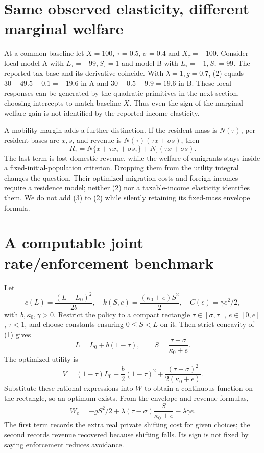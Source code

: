 \documentclass[11pt]{article}
\theoremstyle{definition}
\begin{document}
\section*{Same observed elasticity, different marginal welfare}
At a common baseline let $X=100$, $\tau=0.5$, $\sigma=0.4$ and
$X_\tau=-100$. Consider local model A with $L_\tau=-99,S_\tau=1$ and model B
with $L_\tau=-1,S_\tau=99$. The reported tax base and its derivative coincide.
With $\lambda=1,g=0.7$, (2) equals $30-49.5-0.1=-19.6$ in A and $30-0.5-9.9=19.6$ in B.
These local responses can be generated by the quadratic primitives in the next
section, choosing intercepts to match baseline $X$. Thus even the sign of the
marginal welfare gain is not identified by the reported-income elasticity.

A mobility margin adds a further distinction. If the resident mass is $N(\tau)$,
per-resident bases are $x,s$, and revenue is
$N(\tau)(\tau x+\sigma s)$, then
\[
 R_\tau=N\{x+\tau x_\tau+\sigma s_\tau\}
       +N_\tau(\tau x+\sigma s).                         \tag{3}
\]
The last term is lost domestic revenue, while the welfare of emigrants stays
inside a fixed-initial-population criterion. Dropping them from the utility
integral changes the question. Their optimized migration costs and foreign
incomes require a residence model; neither (2) nor a taxable-income elasticity
identifies them. We do not add (3) to (2) while silently retaining its fixed-mass
envelope formula.

\section*{A computable joint rate/enforcement benchmark}
Let
\[
 c(L)=\frac{(L-L_0)^2}{2b},\quad
 k(S,e)=\frac{(\kappa_0+e)S^2}{2},\quad
 C(e)=\gamma e^2/2,
\]
with $b,\kappa_0,\gamma>0$. Restrict the policy to a compact rectangle
$\tau\in[\sigma,\bar\tau]$, $e\in[0,\bar e]$, $\bar\tau<1$,
and choose constants ensuring $0\le S<L$ on it. Then strict concavity of (1)
gives
\[
 L=L_0+b(1-\tau),\qquad S=\frac{\tau-\sigma}{\kappa_0+e}.
\]
The optimized utility is
\[
 V=(1-\tau)L_0+\frac b2(1-\tau)^2+
               \frac{(\tau-\sigma)^2}{2(\kappa_0+e)}.
\]
Substitute these rational expressions into $W$ to obtain a continuous function
on the rectangle, so an optimum exists. From the envelope and revenue formulas,
\[
 W_e=-gS^2/2+\lambda(\tau-\sigma)\frac{S}{\kappa_0+e}
                    -\lambda\gamma e.                   \tag{4}
\]
The first term records the extra real private shifting cost for given choices;
the second records revenue recovered because shifting falls. Its sign is not
fixed by saying enforcement reduces avoidance.
\end{document}

